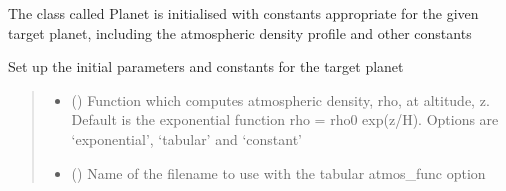 \documentclass[letterpaper,10pt,english]{sphinxmanual}
\begin{document}
\begin{fulllineitems}
\label{\detokenize{index:solver.Planet}}
\pysigstartsignatures
{}
\pysigstopsignatures
\sphinxAtStartPar
The class called Planet is initialised with constants appropriate
for the given target planet, including the atmospheric density profile
and other constants

\sphinxAtStartPar
Set up the initial parameters and constants for the target planet
\begin{quote}\begin{description}
\begin{itemize}
\item {} 
\sphinxAtStartPar
{} (\sphinxstyleliteralemphasis{\sphinxupquote{, }}) \textendash{} Function which computes atmospheric density, rho, at altitude, z.
Default is the exponential function rho = rho0 exp(\sphinxhyphen{}z/H).
Options are ‘exponential’, ‘tabular’ and ‘constant’

\item {} 
\sphinxAtStartPar
{} (\sphinxstyleliteralemphasis{\sphinxupquote{, }}) \textendash{} Name of the filename to use with the tabular atmos\_func option


\end{itemize}
\end{description}
\end{quote}
\end{fulllineitems}
\end{document}

